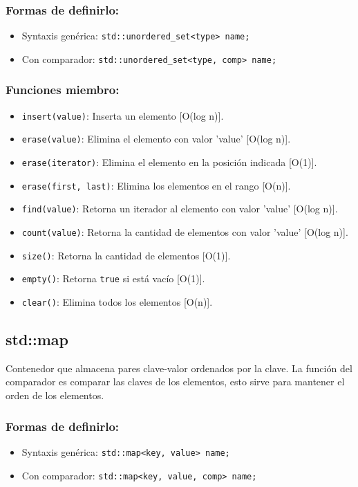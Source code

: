 \subsubsection{Formas de definirlo:}
\begin{itemize}
  \item Syntaxis genérica: \texttt{std::unordered\_set<type> name;}
  \item Con comparador: \texttt{std::unordered\_set<type, comp> name;}
\end{itemize}

\subsubsection{Funciones miembro:}
\begin{itemize}
  \item \texttt{insert(value)}: Inserta un elemento [O(log n)]. 
  \item \texttt{erase(value)}: Elimina el elemento con valor 'value' [O(log n)].
  \item \texttt{erase(iterator)}: Elimina el elemento en la posición indicada [O(1)].
  \item \texttt{erase(first, last)}: Elimina los elementos en el rango [O(n)].
  \item \texttt{find(value)}: Retorna un iterador al elemento con valor 'value' [O(log n)]. 
  \item \texttt{count(value)}: Retorna la cantidad de elementos con valor 'value' [O(log n)]. 
  \item \texttt{size()}: Retorna la cantidad de elementos [O(1)]. 
  \item \texttt{empty()}: Retorna \texttt{true} si está vacío [O(1)]. 
  \item \texttt{clear()}: Elimina todos los elementos [O(n)]. 
\end{itemize}

\subsection{std::map}
\label{subsec:std_map}
Contenedor que almacena pares clave-valor ordenados por la clave. La función del comparador es comparar las claves de los elementos, esto sirve para mantener el orden de los elementos.

\subsubsection{Formas de definirlo:}
\begin{itemize}
  \item Syntaxis genérica: \texttt{std::map<key, value> name;}
  \item Con comparador: \texttt{std::map<key, value, comp> name;}
\end{itemize}


